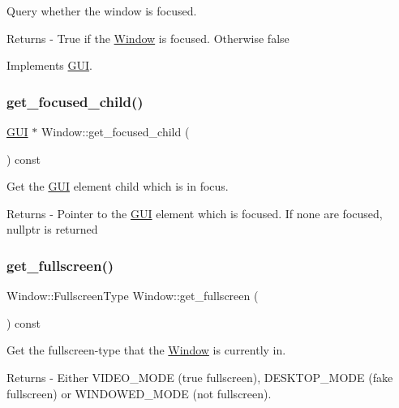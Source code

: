 Query whether the window is focused. \begin{DoxyReturn}{Returns}
-\/ True if the \mbox{\hyperlink{class_window}{Window}} is focused. Otherwise false 
\end{DoxyReturn}


Implements \mbox{\hyperlink{class_g_u_i_ad2a7c1ae3938ba1d6dea0142f16d6c2b}{G\+UI}}.

\mbox{\label{class_window_af2f8beb54b28dc32d93f6b5f403d2152}} 
\subsubsection{\texorpdfstring{get\+\_\+focused\+\_\+child()}{get\_focused\_child()}}
{\footnotesize\ttfamily \mbox{\hyperlink{class_g_u_i}{G\+UI}} $\ast$ Window\+::get\+\_\+focused\+\_\+child (\begin{DoxyParamCaption}{ }\end{DoxyParamCaption}) const}

Get the \mbox{\hyperlink{class_g_u_i}{G\+UI}} element child which is in focus. \begin{DoxyReturn}{Returns}
-\/ Pointer to the \mbox{\hyperlink{class_g_u_i}{G\+UI}} element which is focused. If none are focused, nullptr is returned 
\end{DoxyReturn}
\mbox{\label{class_window_aba76e9ee7a1fc05a26340154244bd967}} 
\subsubsection{\texorpdfstring{get\+\_\+fullscreen()}{get\_fullscreen()}}
{\footnotesize\ttfamily Window\+::\+Fullscreen\+Type Window\+::get\+\_\+fullscreen (\begin{DoxyParamCaption}{ }\end{DoxyParamCaption}) const}

Get the fullscreen-\/type that the \mbox{\hyperlink{class_window}{Window}} is currently in. \begin{DoxyReturn}{Returns}
-\/ Either V\+I\+D\+E\+O\+\_\+\+M\+O\+DE (true fullscreen), D\+E\+S\+K\+T\+O\+P\+\_\+\+M\+O\+DE (fake fullscreen) or W\+I\+N\+D\+O\+W\+E\+D\+\_\+\+M\+O\+DE (not fullscreen). 
\end{DoxyReturn}
\mbox{\label{class_window_a73b7959b6435d574d5ddbb6115153724}} 
